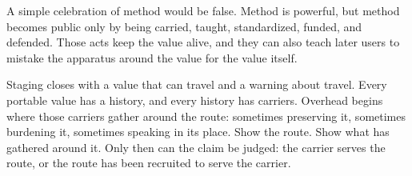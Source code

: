 \begin{movementclose}
A simple celebration of method would be false. Method is powerful, but method
becomes public only by being carried, taught, standardized, funded, and
defended. Those acts keep the value alive, and they can also teach later
users to mistake the apparatus around the value for the value itself.

Staging closes with a value that can travel and a warning about travel.
Every portable value has a history, and every history has carriers. Overhead
begins where those carriers gather around the route: sometimes preserving
it, sometimes burdening it, sometimes speaking in its place. Show the
route. Show what has gathered around it. Only then can the claim be judged:
the carrier serves the route, or the route has been recruited to serve the
carrier.
\end{movementclose}
